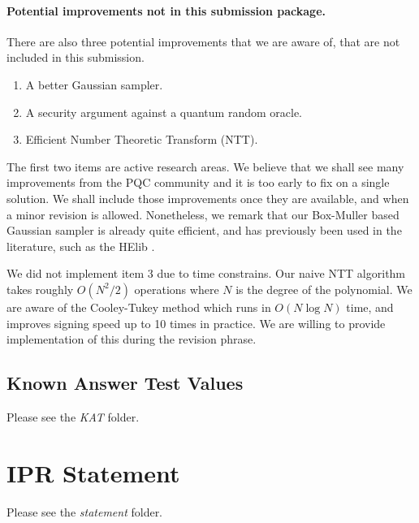 \documentclass{llncs}
\newcommand{\<}{\langle}
\renewcommand{\>}{\rangle}
\begin{document}
\paragraph{Potential improvements not in this submission package.} 
There are also three potential improvements that we are aware of, that
are not included in this submission.
\begin{enumerate}
\item A better Gaussian sampler.
\item A security argument against a quantum random oracle.
\item Efficient Number Theoretic Transform (NTT). 
\end{enumerate}
The first two items are active research areas. We believe that we shall
see many improvements from the PQC community and it is too early to fix
on a single solution. We shall include those improvements once they are
available, and when a minor revision is allowed. Nonetheless, we remark
that our Box-Muller based Gaussian sampler is already quite efficient, 
and has previously been used in the literature, such as the HElib \cite{DBLP:conf/crypto/HaleviS14}. 

We did not implement item 3 due to time constrains. Our naive
 NTT algorithm takes roughly $O(N^2/2)$ operations where $N$ is the degree
 of the polynomial. We are aware of the Cooley-Tukey method which runs 
in $O(N\log N)$ time, and improves signing speed up to 10 times in practice.
We are willing to provide implementation of this during the revision phrase. 


\subsection{Known Answer Test Values}

Please see the {\em KAT} folder.


\section{IPR Statement}
Please see the {\em statement} folder.



\end{document}
